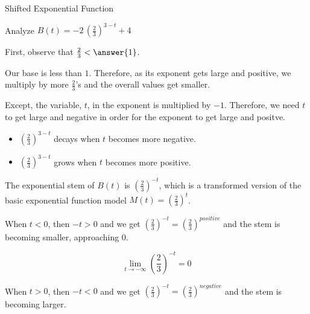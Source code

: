 \documentclass{ximera}
\begin{document}
\begin{example}  Shifted Exponential Function



Analyze   $B(t) = -2 \, \left( \frac{2}{3} \right)^{3-t} + 4$ \\


\begin{observation}


First, observe that $\frac{2}{3} < \answer{1}$.


Our base is less than $1$.  Therefore, as its exponent gets large and positive, we multiply by more $\frac{2}{3}$'s and the overall values get smaller.


Except, the variable, $t$, in the exponent is multiplied by $-1$.  Therefore, we need $t$ to get large and negative in order for the exponent to get large and positve.


\begin{itemize}
\item $\left( \frac{2}{3} \right)^{3-t}$ decays when $t$ becomes more negative.
\item $\left( \frac{2}{3} \right)^{3-t}$ grows when $t$ becomes more positive.
\end{itemize}





\end{observation}



\begin{explanation}




\begin{model}

The exponential stem of $B(t)$ is $\left( \frac{2}{3} \right)^{-t}$, which is a transformed version of the basic exponential function model $M(t) = \left( \frac{2}{3} \right)^{t}$.  



When $t < 0$, then $-t > 0$ and we get  $\left( \frac{2}{3} \right)^{-t} = \left( \frac{2}{3} \right)^{positive}$ and the stem is becoming smaller, approaching $0$.  





\[ \lim\limits_{t \to -\infty} \left( \frac{2}{3} \right)^{-t} = 0 \]



When $t > 0$, then $-t < 0$ and we get  $\left( \frac{2}{3} \right)^{-t} = \left( \frac{2}{3} \right)^{negative}$ and the stem is becoming larger.  




\end{model}
\end{explanation}
\end{example}
\end{document}
